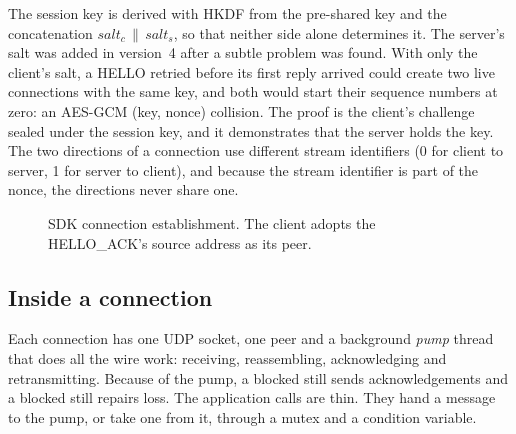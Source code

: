 The session key is derived with HKDF from the pre-shared key and the concatenation
$\mathit{salt}_c\,\|\,\mathit{salt}_s$, so that neither side alone determines it. The server's salt was added
in version~4 after a subtle problem was found. With only the client's salt, a HELLO retried before its first
reply arrived could create two live connections with the same key, and both would start their sequence numbers
at zero: an AES-GCM (key, nonce) collision. The proof is the client's challenge sealed under the session key, and
it demonstrates that the server holds the key. The two directions of a connection use different stream
identifiers (0 for client to server, 1 for server to client), and because the stream identifier is part of the
nonce, the directions never share one.

\begin{figure}[H]
\centering
{}
\caption{SDK connection establishment. The client adopts the HELLO\_ACK's source address as its peer.}\label{fig:sdkconnect}
\end{figure}

\subsection{Inside a connection}

Each connection has one UDP socket, one peer and a background \emph{pump} thread that does all the wire work:
receiving, reassembling, acknowledging and retransmitting. Because of the pump, a blocked  still
sends acknowledgements and a blocked  still repairs loss. The application calls are thin. They
hand a message to the pump, or take one from it, through a mutex and a condition variable.

